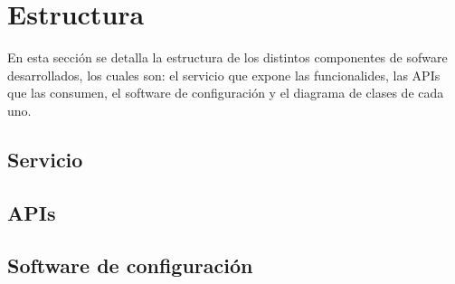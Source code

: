 \section{Estructura}
En esta sección se detalla la estructura de los distintos componentes de sofware desarrollados, los cuales son: el servicio que expone las funcionalides, las APIs que las consumen, el software de configuración  y el diagrama de clases de cada uno.

\subsection{Servicio}
\subsection{APIs}
\subsection{Software de configuración}